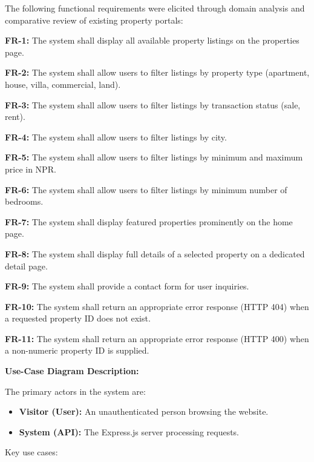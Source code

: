 \documentclass[12pt,a4paper]{report}
\begin{document}
The following functional requirements were elicited through domain analysis and comparative review of existing property portals:

\textbf{FR-1:} The system shall display all available property listings on the properties page.

\textbf{FR-2:} The system shall allow users to filter listings by property type (apartment, house, villa, commercial, land).

\textbf{FR-3:} The system shall allow users to filter listings by transaction status (sale, rent).

\textbf{FR-4:} The system shall allow users to filter listings by city.

\textbf{FR-5:} The system shall allow users to filter listings by minimum and maximum price in NPR.

\textbf{FR-6:} The system shall allow users to filter listings by minimum number of bedrooms.

\textbf{FR-7:} The system shall display featured properties prominently on the home page.

\textbf{FR-8:} The system shall display full details of a selected property on a dedicated detail page.

\textbf{FR-9:} The system shall provide a contact form for user inquiries.

\textbf{FR-10:} The system shall return an appropriate error response (HTTP 404) when a requested property ID does not exist.

\textbf{FR-11:} The system shall return an appropriate error response (HTTP 400) when a non-numeric property ID is supplied.

\textbf{Use-Case Diagram Description:}

The primary actors in the system are:

\begin{itemize}
  \item \textbullet{} \textbf{Visitor (User):} An unauthenticated person browsing the website.
  \item \textbullet{} \textbf{System (API):} The Express.js server processing requests.
\end{itemize}
Key use cases:
\end{document}
